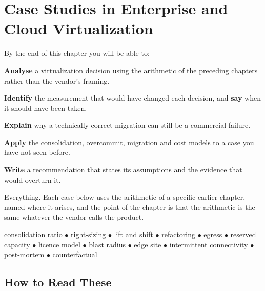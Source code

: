 \chapter{Case Studies in Enterprise and Cloud Virtualization}\label{ch:casestudies}

\begin{outcomes}
By the end of this chapter you will be able to:
\begin{tight}
  \item \textbf{Analyse} a virtualization decision using the arithmetic of the
        preceding chapters rather than the vendor's framing.
  \item \textbf{Identify} the measurement that would have changed each
        decision, and \textbf{say} when it should have been taken.
  \item \textbf{Explain} why a technically correct migration can still be a
        commercial failure.
  \item \textbf{Apply} the consolidation, overcommit, migration and cost models
        to a case you have not seen before.
  \item \textbf{Write} a recommendation that states its assumptions and the
        evidence that would overturn it.
\end{tight}
\end{outcomes}

\begin{prereq}
Everything. Each case below uses the arithmetic of a specific earlier chapter,
named where it arises, and the point of the chapter is that the arithmetic is
the same whatever the vendor calls the product.
\end{prereq}

\begin{keyterms}
consolidation ratio $\bullet$ right-sizing $\bullet$ lift and shift $\bullet$
refactoring $\bullet$ egress $\bullet$ reserved capacity $\bullet$ licence
model $\bullet$ blast radius $\bullet$ edge site $\bullet$ intermittent
connectivity $\bullet$ post-mortem $\bullet$ counterfactual
\end{keyterms}

\section{How to Read These}

